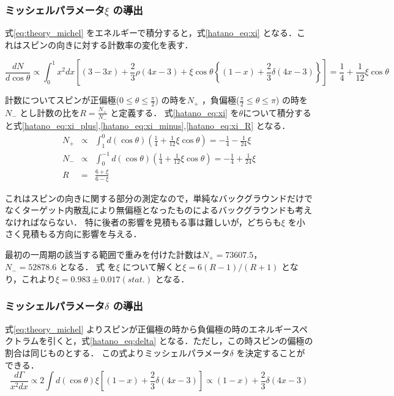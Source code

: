 \subsubsection{ミッシェルパラメータ$\xi$ の導出}
式\eqref{eq:theory_michel} をエネルギーで積分すると，式\eqref{hatano_eq:xi} となる．これはスピンの向きに対する計数率の変化を表す．

\begin{equation}
  \frac{dN}{d\cos\theta} \propto \int^1_0 x^2dx\left[ (3-3x) + \frac{2}{3}\rho(4x-3) + \xi\cos\theta\left\{ (1-x) + \frac{2}{3}\delta(4x-3) \right\}\right] = \frac{1}{4} + \frac{1}{12}\xi\cos\theta
  \label{hatano_eq:xi}
\end{equation}

計数についてスピンが正偏極($0\leq\theta\leq\frac{\pi}{2}$) の時を$N_+$ ，負偏極($\frac{\pi}{2}\leq\theta\leq\pi$) の時を$N_-$ とし計数の比を$R=\frac{N_+}{N_-}$ と定義する．
式\eqref{hatano_eq:xi} を$\theta$について積分すると式\eqref{hatano_eq:xi_plus},\eqref{hatano_eq:xi_minus},\eqref{hatano_eq:xi_R} となる．
\begin{eqnarray}
  N_+ & \propto & \int^0_1 d(\cos\theta) \left(\frac{1}{4} + \frac{1}{12}\xi\cos\theta\right)=-\frac{1}{4}-\frac{1}{24}\xi \label{hatano_eq:xi_plus} \\
  N_- & \propto & \int^{-1}_0 d(\cos\theta) \left(\frac{1}{4} + \frac{1}{12}\xi\cos\theta\right)=-\frac{1}{4}+\frac{1}{24}\xi \label{hatano_eq:xi_minus} \\
  R  & = & \frac{6+\xi}{6-\xi} \label{hatano_eq:xi_R}
\end{eqnarray}

これはスピンの向きに関する部分の測定なので，単純なバックグラウンドだけでなくターゲット内散乱により無偏極となったものによるバックグラウンドも考えなければならない．
特に後者の影響を見積もる事は難しいが，どちらも$\xi$ を小さく見積もる方向に影響を与える．

最初の一周期の該当する範囲で重みを付けた計数は$N_+=73607.5$，$N_-=52878.6$ となる．
式\label{hatano_eq:xi_ratio} を$\xi$ について解くと$\xi=6(R-1) / (R+1)$ となり，これより$\xi=0.983\pm0.017 (stat.)$ となる．

\subsubsection{ミッシェルパラメータ$\delta$ の導出}
式\eqref{eq:theory_michel} よりスピンが正偏極の時から負偏極の時のエネルギースペクトラムを引くと，式\eqref{hatano_eq:delta} となる．ただし，この時スピンの偏極の割合は同じものとする．
この式よりミッシェルパラメータ$\delta$ を決定することができる．
\begin{equation}
  \frac{d\Gamma}{x^2dx} \propto 2 \int d(\cos\theta) \xi \left[ (1-x) + \frac{2}{3}\delta(4x-3) \right] \propto (1-x) + \frac{2}{3}\delta(4x-3)
  \label{hatano_eq:delta}
\end{equation}

